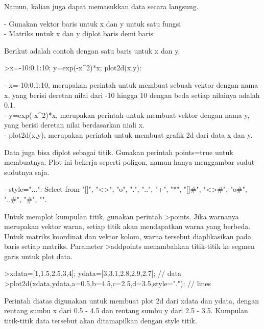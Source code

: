 \documentclass[a4paper,10pt]{article}
\begin{document}
\begin{eulernotebook}
\begin{eulercomment}
\begin{eulercomment}
\begin{eulercomment}
\begin{eulercomment}
\begin{eulercomment}
\begin{eulercomment}
\begin{eulercomment}
Namun, kalian juga dapat memasukkan data secara langsung.

- Gunakan vektor baris untuk x dan y untuk satu fungsi\\
- Matriks untuk x dan y diplot baris demi  baris

Berikut adalah contoh dengan satu baris untuk x dan y.
\end{eulercomment}
\begin{eulerprompt}
>x=-10:0.1:10; y=exp(-x^2)*x; plot2d(x,y):
\end{eulerprompt}
\begin{eulercomment}
- x=-10:0.1:10, merupakan perintah untuk membuat sebuah vektor dengan
nama x, yang berisi deretan nilai dari -10 hingga 10 dengan beda
setiap nilainya adalah 0.1.\\
- y=exp(-x\textasciicircum{}2)*x, merupakan perintah untuk membuat vektor dengan nama
y, yang berisi deretan nilai berdasarkan niali x.\\
- plot2d(x,y), merupakan perintah untuk membuat grafik 2d dari data x
dan y.

Data juga bisa diplot sebagai titik. Gunakan perintah points=true
untuk membuatnya. Plot ini bekerja seperti poligon, namun hanya
menggambar sudut-sudutnya saja.

- style="...": Select from "[]", "\textless{}\textgreater{}", "o", ".", "..", "+", "*",
"[]#", "\textless{}\textgreater{}#", "o#", "..#", "#", "\textbar{}".

Untuk memplot kumpulan titik, gunakan perintah \textgreater{}points. Jika warnanya
merupakan vektor warna, setiap titik akan mendapatkan warna yang
berbeda. Untuk matriks koordinat dan vektor kolom, warna tersebut
diaplikasikan pada baris setiap matriks. Parameter \textgreater{}addpoints
menambahkan titik-titik ke segmen garis untuk plot data.
\end{eulercomment}
\begin{eulerprompt}
>xdata=[1,1.5,2.5,3,4]; ydata=[3,3.1,2.8,2.9,2.7]; // data
>plot2d(xdata,ydata,a=0.5,b=4.5,c=2.5,d=3.5,style="."): // lines
\end{eulerprompt}
\begin{eulercomment}
Perintah diatas digunakan untuk membuat plot 2d dari xdata dan ydata,
dengan rentang sumbu x dari 0.5 - 4.5 dan rentang sumbu y dari 2.5 -
3.5. Kumpulan titik-titik data tersebut akan ditamapilkan dengan style
titik.


\end{eulercomment}
\end{eulercomment}
\end{eulercomment}
\end{eulercomment}
\end{eulercomment}
\end{eulercomment}
\end{eulercomment}
\end{eulernotebook}
\end{document}
